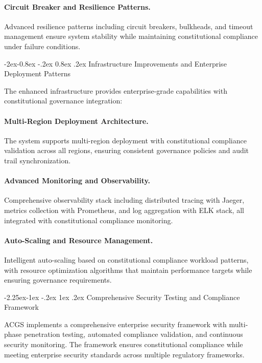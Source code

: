 \documentclass[manuscript,screen,9pt]{acmart}
\makeatletter
\renewcommand\subsection{\@startsection{subsection}{2}{\z@}%
  {-2.25ex\@plus -1ex \@minus -.2ex}%
  {1ex \@plus .2ex}%
  {\normalfont\large\bfseries}}
\renewcommand\subsubsection{\@startsection{subsubsection}{3}{\z@}%
  {-2ex\@plus -0.8ex \@minus -.2ex}%
  {0.8ex \@plus .2ex}%
  {\normalfont\normalsize\bfseries}}
\makeatother
\begin{document}
\paragraph{Circuit Breaker and Resilience Patterns.} Advanced resilience patterns including circuit breakers, bulkheads, and timeout management ensure system stability while maintaining constitutional compliance under failure conditions.

\subsubsection{Infrastructure Improvements and Enterprise Deployment Patterns}
\label{subsubsec:infrastructure_improvements}

The enhanced infrastructure provides enterprise-grade capabilities with constitutional governance integration:

\paragraph{Multi-Region Deployment Architecture.} The system supports multi-region deployment with constitutional compliance validation across all regions, ensuring consistent governance policies and audit trail synchronization.

\paragraph{Advanced Monitoring and Observability.} Comprehensive observability stack including distributed tracing with Jaeger, metrics collection with Prometheus, and log aggregation with ELK stack, all integrated with constitutional compliance monitoring.

\paragraph{Auto-Scaling and Resource Management.} Intelligent auto-scaling based on constitutional compliance workload patterns, with resource optimization algorithms that maintain performance targets while ensuring governance requirements.

\subsection{Comprehensive Security Testing and Compliance Framework}
\label{subsec:security_compliance_framework}

ACGS implements a comprehensive enterprise security framework with multi-phase penetration testing, automated compliance validation, and continuous security monitoring. The framework ensures constitutional compliance while meeting enterprise security standards across multiple regulatory frameworks.
\end{document}
